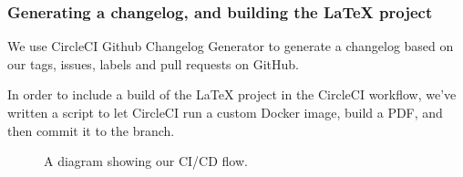 \subsubsection{Generating a changelog, and building the LaTeX project}

We use CircleCI Github Changelog Generator \cite{tool:changelog-generator} to generate a changelog based on our tags, issues, labels and pull requests on GitHub.

In order to include a build of the LaTeX project in the CircleCI workflow, we've written a script to let CircleCI run a custom Docker image, build a PDF, and then commit it to the branch.

\begin{figure}[H]
    \caption{A diagram showing our CI/CD flow.}
    \label{fig:ci-cd-diagram}
\end{figure}
